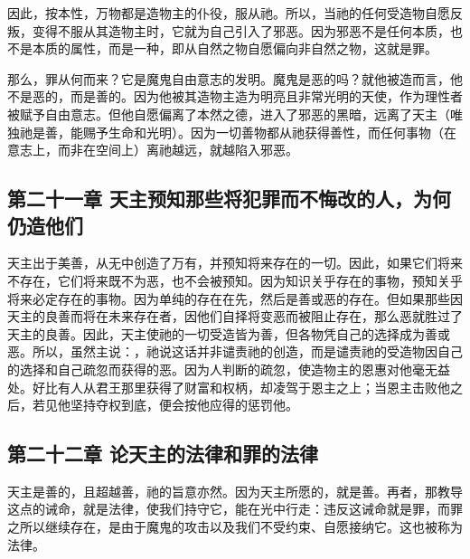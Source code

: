 因此，按本性，万物都是造物主的仆役，服从祂。所以，当祂的任何受造物自愿反叛，变得不服从其造物主时，它就为自己引入了邪恶。因为邪恶不是任何本质，也不是本质的属性，而是一种，即从自然之物自愿偏向非自然之物，这就是罪。\par

那么，罪从何而来？它是魔鬼自由意志的发明。魔鬼是恶的吗？就他被造而言，他不是恶的，而是善的。因为他被其造物主造为明亮且非常光明的天使，作为理性者被赋予自由意志。但他自愿偏离了本然之德，进入了邪恶的黑暗，远离了天主（唯独祂是善，能赐予生命和光明）。因为一切善物都从祂获得善性，而任何事物（在意志上，而非在空间上）离祂越远，就越陷入邪恶。\par


\subsection{第二十一章 天主预知那些将犯罪而不悔改的人，为何仍造他们}

天主出于美善，从无中创造了万有，并预知将来存在的一切。因此，如果它们将来不存在，它们将来既不为恶，也不会被预知。因为知识关乎存在的事物，预知关乎将来必定存在的事物。因为单纯的存在在先，然后是善或恶的存在。但如果那些因天主的良善而将在未来存在者，因他们自择将变恶而被阻止存在，那么恶就胜过了天主的良善。因此，天主使祂的一切受造皆为善，但各物凭自己的选择成为善或恶。所以，虽然主说：，祂说这话并非谴责祂的创造，而是谴责祂的受造物因自己的选择和自己疏忽而获得的恶。因为人判断的疏忽，使造物主的恩惠对他毫无益处。好比有人从君王那里获得了财富和权柄，却凌驾于恩主之上；当恩主击败他之后，若见他坚持夺权到底，便会按他应得的惩罚他。\par


\subsection{第二十二章 论天主的法律和罪的法律}

天主是善的，且超越善，祂的旨意亦然。因为天主所愿的，就是善。再者，那教导这点的诫命，就是法律，使我们持守它，能在光中行走：违反这诫命就是罪，而罪之所以继续存在，是由于魔鬼的攻击以及我们不受约束、自愿接纳它。这也被称为法律。\par

